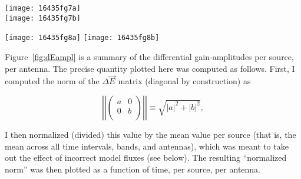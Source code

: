 \documentclass{aa}
\newcommand{\matrixtt}[4]{\left( \begin{array}{cc}#1&#2\\#3&#4\\\end{array} \right)}
\newcommand{\jones}[2]{\vec {#1}_{#2}}
\begin{document}
\begin{figure*}
\sidecaption
\parbox[b]{12cm}{
\texttt{[image: 16435fg7a]} \\
\texttt{[image: 16435fg7b]}
}
\caption{\label{fig:dEampl}Differential gain-amplitudes ($||\Delta\jones{E}{}||$) as a function of time for the 2003 (top) and 2006 (bottom) observations. Rows correspond to sources, columns to antennas. The vertical plot scale is fixed within each row, but differs from row to row. Horizontal lines indicate the $||\Delta\jones{E}{}||=1$ level.}
\end{figure*}

\begin{figure*}
\sidecaption
\parbox[b]{12cm}{
\texttt{[image: 16435fg8a]}
\texttt{[image: 16435fg8b]}
}
\caption{\label{fig:dEphase}Differential gain-phases ($\arg\Delta\jones{E}{}$, in degrees) as a function of time for the 2003 (top) and 2006 (bottom) observations. Rows correspond to sources, columns to antennas. The vertical plot scale is fixed within each row, but differs from row to row. Horizontal lines indicate the $\arg\Delta\jones{E}{}=0$ level.}
\end{figure*}

Figure~\ref{fig:dEampl} is a summary of the differential gain-amplitudes per source, per antenna. The precise quantity plotted here was computed as follows. First, I computed the norm of the $\Delta\jones{E}{}$ matrix (diagonal by construction) as 

\[
\left|\left|\matrixtt{a}{0}{0}{b}\right|\right| \equiv \sqrt{|a|^2+|b|^2},
\]

I then normalized (divided) this value by the mean value per source (that is, the mean across all time intervals, bands, and antennas), which was meant to take out the effect of incorrect model fluxes (see below). The resulting ``normalized norm'' was then plotted as a function of time, per source, per antenna.
\end{document}
